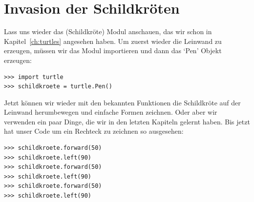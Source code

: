 

\chapter{Invasion der Schildkröten}\label{ch:turtlesgalore}


Lass uns wieder das  (Schildkröte) Modul anschauen, das wir schon in Kapitel~\ref{ch:turtles} angesehen haben. Um zuerst wieder die Leinwand zu erzeugen, müssen wir das Modul importieren und dann das `Pen' Objekt erzeugen:

\begin{Verbatim}[frame=single]
>>> import turtle
>>> schildkroete = turtle.Pen()
\end{Verbatim}

Jetzt können wir wieder mit den bekannten Funktionen die Schildkröte auf der Leinwand herumbewegen und einfache Formen zeichnen. Oder aber wir verwenden ein paar Dinge, die wir in den letzten Kapiteln gelernt haben. Bis jetzt hat unser Code um ein Rechteck zu zeichnen so ausgesehen:

\begin{Verbatim}[frame=single]
>>> schildkroete.forward(50)
>>> schildkroete.left(90)
>>> schildkroete.forward(50)
>>> schildkroete.left(90)
>>> schildkroete.forward(50)
>>> schildkroete.left(90)
\end{Verbatim}

